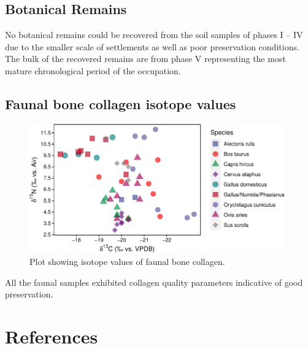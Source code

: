 \documentclass[3p]{elsarticle} %
\begin{document}
\hypertarget{botanical-remains}{%
\subsection{Botanical Remains}\label{botanical-remains}}

No botanical remains could be recovered from the soil samples of phases I -- IV due to the smaller scale of settlements as well as poor preservation conditions. The bulk of the recovered remains are from phase V representing the most mature chronological period of the occupation.

\hypertarget{faunal-bone-collagen-isotope-values}{%
\subsection{Faunal bone collagen isotope values}\label{faunal-bone-collagen-isotope-values}}

\begin{figure}
\includegraphics[width=0.98\textwidth]{castro_main_body_files/figure-latex/comp-iso-plot-1} \caption{Plot showing isotope values of faunal bone collagen.}\label{fig:comp-iso-plot}
\end{figure}

All the faunal samples exhibited collagen quality parameters indicative of good preservation.

\hypertarget{references}{%
\section*{References}\label{references}}
\end{document}
